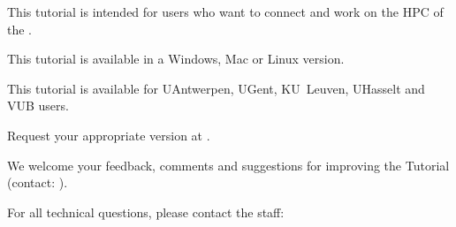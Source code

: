 This tutorial is intended for users who want to connect and work on the HPC of the \strong{\university}.

This tutorial is available in a Windows, Mac or Linux version.

This tutorial is available for UAntwerpen, UGent, KU~Leuven, UHasselt and VUB users.

Request your appropriate version at \hpcinfo.


We welcome your feedback, comments and suggestions for improving the \hpc
Tutorial  (contact: \hpcinfo).

For all technical questions, please contact the \hpc staff:



